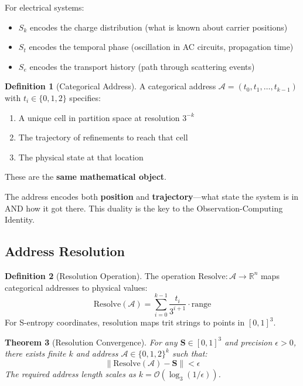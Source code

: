 \documentclass[twocolumn,10pt]{article}
\newtheorem{theorem}{Theorem}[section]
\theoremstyle{definition}
\newtheorem{definition}[theorem]{Definition}
\theoremstyle{remark}
\newcommand{\Scoord}{\mathbf{S}}
\newcommand{\Sk}{S_k}
\newcommand{\St}{S_t}
\newcommand{\Se}{S_e}
\newcommand{\bigO}{\mathcal{O}}
\begin{document}
For electrical systems:
\begin{itemize}
    \item $\Sk$ encodes the charge distribution (what is known about carrier positions)
    \item $\St$ encodes the temporal phase (oscillation in AC circuits, propagation time)
    \item $\Se$ encodes the transport history (path through scattering events)
\end{itemize}

\begin{definition}[Categorical Address]
\label{def:address}
A categorical address $\mathcal{A} = (t_0, t_1, \ldots, t_{k-1})$ with $t_i \in \{0, 1, 2\}$ specifies:
\begin{enumerate}
    \item A unique cell in partition space at resolution $3^{-k}$
    \item The trajectory of refinements to reach that cell
    \item The physical state at that location
\end{enumerate}
These are the \textbf{same mathematical object}.
\end{definition}

The address encodes both \textbf{position} and \textbf{trajectory}---what state the system is in AND how it got there. This duality is the key to the Observation-Computing Identity.

\subsection{Address Resolution}

\begin{definition}[Resolution Operation]
\label{def:resolution}
The operation $\text{Resolve}: \mathcal{A} \to \mathbb{R}^n$ maps categorical addresses to physical values:
\begin{equation}
\text{Resolve}(\mathcal{A}) = \sum_{i=0}^{k-1} \frac{t_i}{3^{i+1}} \cdot \text{range}
\end{equation}
For S-entropy coordinates, resolution maps trit strings to points in $[0,1]^3$.
\end{definition}

\begin{theorem}[Resolution Convergence]
\label{thm:resolution}
For any $\Scoord \in [0,1]^3$ and precision $\epsilon > 0$, there exists finite $k$ and address $\mathcal{A} \in \{0,1,2\}^k$ such that:
\begin{equation}
\|\text{Resolve}(\mathcal{A}) - \Scoord\| < \epsilon
\end{equation}
The required address length scales as $k = \bigO(\log_3(1/\epsilon))$.
\end{theorem}
\end{document}

